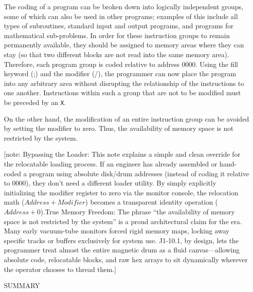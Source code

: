\documentclass{article}
\begin{document}
\begin{enumerate}
The coding of a program can be broken down into logically independent groups, some of which can also be used in other programs; examples of this include all types of subroutines, standard input and output programs, and programs for mathematical sub-problems. In order for these instruction groups to remain permanently available, they should be assigned to memory areas where they can stay (so that two different blocks are not read into the same memory area). Therefore, each program group is coded relative to address 0000. Using the fill keyword (;) and the modifier (/), the programmer can now place the program into any arbitrary area without disrupting the relationship of the instructions to one another. Instructions within such a group that are not to be modified must be preceded by an \texttt{X}.

On the other hand, the modification of an entire instruction group can be avoided by setting the modifier to zero. Thus, the availability of memory space is not restricted by the system.

[note: Bypassing the Loader: This note explains a simple and clean override for the relocatable loading process. If an engineer has already assembled or hand-coded a program using absolute disk/drum addresses (instead of coding it relative to 0000), they don't need a different loader utility. By simply explicitly initializing the modifier register to zero via the monitor console, the relocation math ($Address + Modifier$) becomes a transparent identity operation ($Address + 0$).True Memory Freedom: The phrase ``the availability of memory space is not restricted by the system'' is a proud architectural claim for the era. Many early vacuum-tube monitors forced rigid memory maps, locking away specific tracks or buffers exclusively for system use. J1-10.1, by design, lets the programmer treat almost the entire magnetic drum as a fluid canvas—allowing absolute code, relocatable blocks, and raw hex arrays to sit dynamically wherever the operator chooses to thread them.]

SUMMARY


\end{enumerate}
\end{document}
